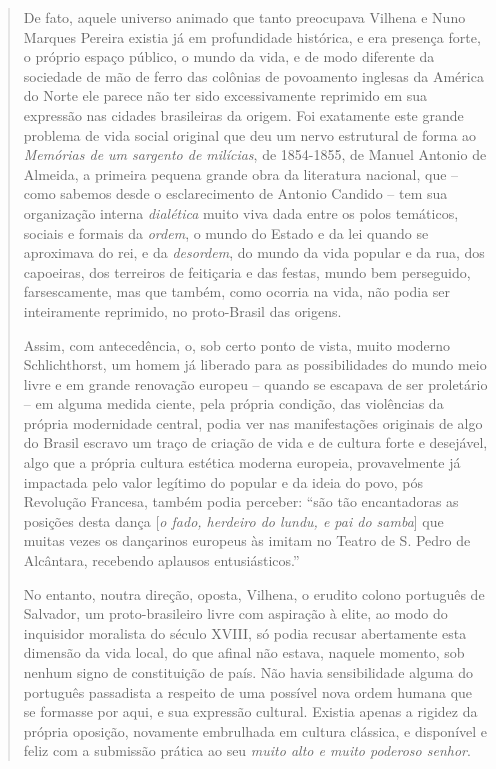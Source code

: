 \begin{quote}
De fato, aquele universo animado que tanto preocupava Vilhena e Nuno
Marques Pereira existia já em profundidade histórica, e era presença
forte, o próprio espaço público, o mundo da vida, e de modo diferente da
sociedade de mão de ferro das colônias de povoamento inglesas da América
do Norte ele parece não ter sido excessivamente reprimido em sua
expressão nas cidades brasileiras da origem. Foi exatamente este grande
problema de vida social original que deu um nervo estrutural de forma ao
\emph{Memórias de um sargento de milícias}, de 1854-1855, de Manuel
Antonio de Almeida, a primeira pequena grande obra da literatura
nacional, que -- como sabemos desde o esclarecimento de Antonio Candido
-- tem sua organização interna \emph{dialética} muito viva dada entre os
polos temáticos, sociais e formais da \emph{ordem}, o mundo do Estado e
da lei quando se aproximava do rei, e da \emph{desordem}, do mundo da
vida popular e da rua, dos capoeiras, dos terreiros de feitiçaria e das
festas, mundo bem perseguido, farsescamente, mas que também, como
ocorria na vida, não podia ser inteiramente reprimido, no proto-Brasil
das origens.

Assim, com antecedência, o, sob certo ponto de vista, muito moderno
Schlichthorst, um homem já liberado para as possibilidades do mundo meio
livre e em grande renovação europeu -- quando se escapava de ser
proletário -- em alguma medida ciente, pela própria condição, das
violências da própria modernidade central, podia ver nas manifestações
originais de algo do Brasil escravo um traço de criação de vida e de
cultura forte e desejável, algo que a própria cultura estética moderna
europeia, provavelmente já impactada pelo valor legítimo do popular e da
ideia do povo, pós Revolução Francesa, também podia perceber: ``são tão
encantadoras as posições desta dança {[}\emph{o fado, herdeiro do lundu,
e pai do samba}{]} que muitas vezes os dançarinos europeus às imitam no
Teatro de S. Pedro de Alcântara, recebendo aplausos entusiásticos.''

No entanto, noutra direção, oposta, Vilhena, o erudito colono português
de Salvador, um proto-brasileiro livre com aspiração à elite, ao modo do
inquisidor moralista do século XVIII, só podia recusar abertamente esta
dimensão da vida local, do que afinal não estava, naquele momento, sob
nenhum signo de constituição de país. Não havia sensibilidade alguma do
português passadista a respeito de uma possível nova ordem humana que se
formasse por aqui, e sua expressão cultural. Existia apenas a rigidez da
própria oposição, novamente embrulhada em cultura clássica, e disponível
e feliz com a submissão prática ao seu \emph{muito alto e muito poderoso
senhor}.


\end{quote}
